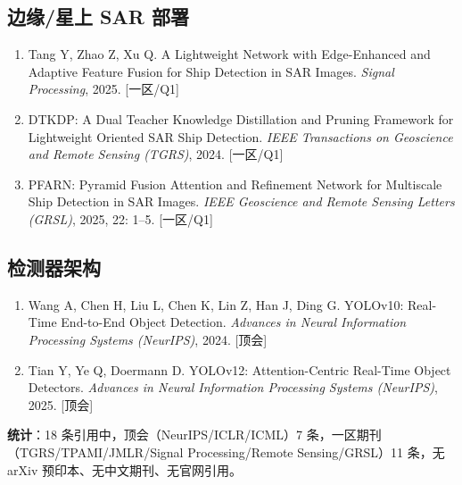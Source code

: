 \subsection{边缘/星上 SAR 部署}\label{ux8fb9ux7f18ux661fux4e0a-sar-ux90e8ux7f72ux4e0eux6607ux817eux5de5ux5177ux94fe}

\begin{enumerate}
\def\labelenumi{\arabic{enumi}.}
\setcounter{enumi}{13}
\tightlist
\item
  Tang Y, Zhao Z, Xu Q. A Lightweight Network with Edge-Enhanced and Adaptive Feature Fusion for Ship Detection in SAR Images. \emph{Signal Processing}, 2025. [一区/Q1]
\item
  DTKDP: A Dual Teacher Knowledge Distillation and Pruning Framework for Lightweight Oriented SAR Ship Detection. \emph{IEEE Transactions on Geoscience and Remote Sensing (TGRS)}, 2024. [一区/Q1]
\item
  PFARN: Pyramid Fusion Attention and Refinement Network for Multiscale Ship Detection in SAR Images. \emph{IEEE Geoscience and Remote Sensing Letters (GRSL)}, 2025, 22: 1–5. [一区/Q1]
\end{enumerate}

\subsection{检测器架构}\label{ux68c0ux6d4bux5668ux67b6ux6784}

\begin{enumerate}
\def\labelenumi{\arabic{enumi}.}
\setcounter{enumi}{16}
\tightlist
\item
  Wang A, Chen H, Liu L, Chen K, Lin Z, Han J, Ding G. YOLOv10: Real-Time End-to-End Object Detection. \emph{Advances in Neural Information Processing Systems (NeurIPS)}, 2024. [顶会]
\item
  Tian Y, Ye Q, Doermann D. YOLOv12: Attention-Centric Real-Time Object Detectors. \emph{Advances in Neural Information Processing Systems (NeurIPS)}, 2025. [顶会]
\end{enumerate}

\textbf{统计}：18 条引用中，顶会（NeurIPS/ICLR/ICML）7 条，一区期刊（TGRS/TPAMI/JMLR/Signal Processing/Remote Sensing/GRSL）11 条，无 arXiv 预印本、无中文期刊、无官网引用。
